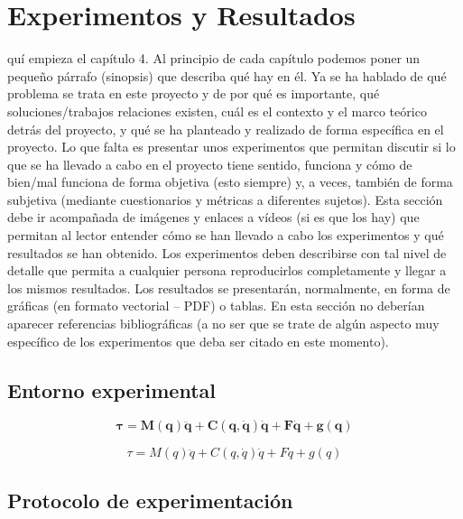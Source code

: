 \documentclass[a4paper,11pt,reqno,twoside]{memoir}
\begin{document}
\clearemptydoublepage
\chapter{Experimentos y Resultados}
\label{cap:experimentos_resultados}
\minitoc
\vspace{1cm}
quí empieza el capítulo 4. Al principio de cada capítulo podemos poner un pequeño párrafo (sinopsis) que describa qué hay en él. Ya se ha hablado de qué problema se trata en este proyecto y de por qué es importante, qué soluciones/trabajos relaciones existen, cuál es el contexto y el marco teórico detrás del proyecto, y qué se ha planteado y realizado de forma específica en el proyecto. Lo que falta es presentar unos experimentos que permitan discutir si lo que se ha llevado a cabo en el proyecto tiene sentido, funciona y cómo de bien/mal funciona de forma objetiva (esto siempre) y, a veces, también de forma subjetiva (mediante cuestionarios y métricas a diferentes sujetos). Esta sección debe ir acompañada de imágenes y enlaces a vídeos (si es que los hay) que permitan al lector entender cómo se han llevado a cabo los experimentos y qué resultados se han obtenido. Los experimentos deben describirse con tal nivel de detalle que permita a cualquier persona reproducirlos completamente y llegar a los mismos resultados. Los resultados se presentarán, normalmente, en forma de gráficas (en formato vectorial -- PDF) o tablas. En esta sección no deberían aparecer referencias bibliográficas (a no ser que se trate de algún aspecto muy específico de los experimentos que deba ser citado en este momento).
\newpage

\section{Entorno experimental}
\label{sec:entorno_experimetal}


\begin{equation}
\mathbf{\boldsymbol{\tau} = M(q) \ddot{q} + C(q,\dot{q}) \dot{q} + F \dot{q} + g (q)}
\end{equation}


\begin{equation}
\tau = M(q) \ddot{q} + C(q,\dot{q}) \dot{q} + F \dot{q} + g (q)
\end{equation}


\section{Protocolo de experimentación}
\label{sec:protocolo}
\end{document}
